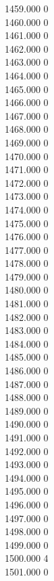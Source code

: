 { 1459.000	0 \\
 1460.000	0 \\
 1461.000	0 \\
 1462.000	0 \\
 1463.000	0 \\
 1464.000	0 \\
 1465.000	0 \\
 1466.000	0 \\
 1467.000	0 \\
 1468.000	0 \\
 1469.000	0 \\
 1470.000	0 \\
 1471.000	0 \\
 1472.000	0 \\
 1473.000	0 \\
 1474.000	0 \\
 1475.000	0 \\
 1476.000	0 \\
 1477.000	0 \\
 1478.000	0 \\
 1479.000	0 \\
 1480.000	0 \\
 1481.000	0 \\
 1482.000	0 \\
 1483.000	0 \\
 1484.000	0 \\
 1485.000	0 \\
 1486.000	0 \\
 1487.000	0 \\
 1488.000	0 \\
 1489.000	0 \\
 1490.000	0 \\
 1491.000	0 \\
 1492.000	0 \\
 1493.000	0 \\
 1494.000	0 \\
 1495.000	0 \\
 1496.000	0 \\
 1497.000	0 \\
 1498.000	0 \\
 1499.000	0 \\
 1500.000	4 \\
 1501.000	0 \\
}
